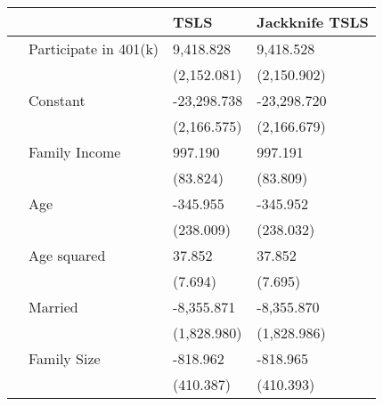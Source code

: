 
\begin{tabular}{llll}
\toprule
  &   & TSLS & Jackknife TSLS\\
\midrule
 & Participate in 401(k) & 9,418.828 & 9,418.528\\
 &  & (2,152.081) & (2,150.902)\\
 & Constant & -23,298.738 & -23,298.720\\
 &  & (2,166.575) & (2,166.679)\\
 & Family Income & 997.190 & 997.191\\
\addlinespace
 &  & (83.824) & (83.809)\\
 & Age & -345.955 & -345.952\\
 &  & (238.009) & (238.032)\\
 & Age squared & 37.852 & 37.852\\
 &  & (7.694) & (7.695)\\
\addlinespace
 & Married & -8,355.871 & -8,355.870\\
 &  & (1,828.980) & (1,828.986)\\
 & Family Size & -818.962 & -818.965\\
 &  & (410.387) & (410.393)\\
\bottomrule
\end{tabular}
